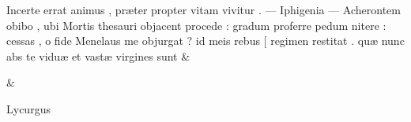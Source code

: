 \documentclass[12pt,onecolumn,twoside,a4paper]{memoir}
\begin{document}
\begin{pairs}
\begin{Leftside}
                              Incerte
                              errat
                              animus
                              ,
                              præter
                              propter
                              vitam
                              vivitur
                              .
                              —
                              Iphigenia
                              —
                              Acherontem
                              obibo
                              ,
                              ubi
                              Mortis
                              thesauri
                              objacent
                              procede
                              :
                              gradum
                              proferre
                              pedum
                              nitere
                              :
                              cessas
                              ,
                              o
                              fide
                              Menelaus
                              me
                              objurgat
                              ?
                              id
                              meis
                              rebus
                              [
                              regimen
                              restitat
                              .
                              quæ
                              nunc
                              abs
                              te
                              viduæ
                              et
                              vastæ
                              virgines
                              sunt
                            \&
                     
                  \endnumbering
		\end{Leftside}
                  \begin{Rightside}
			\beginnumbering
			\numberstanzafalse
                     
                         \stanza 
                      \&
                     
                  \endnumbering
		\end{Rightside}
               \end{pairs}
	\Columns
            
         

         
            Lycurgus
            
\end{document}
